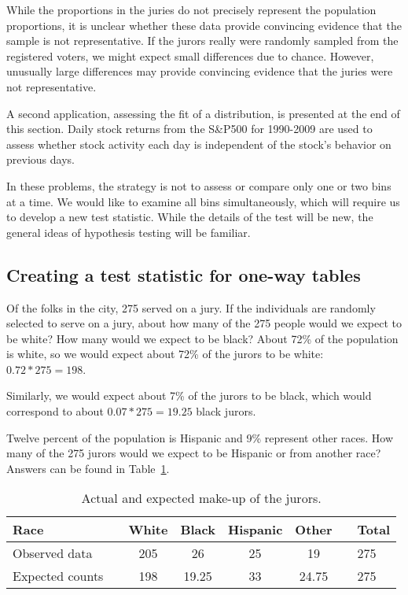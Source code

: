 While the proportions in the juries do not precisely represent the population proportions, it is unclear whether these data provide convincing evidence that the sample is not representative. If the jurors really were randomly sampled from the registered voters, we might expect small differences due to chance. However, unusually large differences may provide convincing evidence that the juries were not representative.

A second application, assessing the fit of a distribution, is presented at the end of this section. Daily stock returns from the S\&P500 for 1990-2009 are used to assess whether stock activity each day is independent of the stock's behavior on previous days.

In these problems, the strategy is not to assess or compare only one or two bins at a time. We would like to examine all bins simultaneously, which will require us to develop a new test statistic. While the details of the test will be new, the general ideas of hypothesis testing will be familiar.

\subsection{Creating a test statistic for one-way tables}

\begin{example}{Of the folks in the city, 275 served on a jury. If the individuals are randomly selected to serve on a jury, about how many of the 275 people would we expect to be white? How many would we expect to be black?}
About 72\% of the population is white, so we would expect about 72\% of the jurors to be white: $0.72*275 = 198$.

Similarly, we would expect about 7\% of the jurors to be black, which would correspond to about $0.07*275 = 19.25$ black jurors.
\end{example}

\begin{exercise}
Twelve percent of the population is Hispanic and 9\% represent other races. How many of the 275 jurors would we expect to be Hispanic or from another race? Answers can be found in Table~\ref{expectedJuryRepresentationIfNoBias}.
\end{exercise}

\begin{table}[h]
\centering
\begin{tabular}{ll ccc c ll}
\hline
Race	 & \hspace{2mm} & White & Black & Hispanic & Other & \hspace{2mm} & Total \\
\hline
Observed data			&	& 205 & 26	& 25 & 19	&	& 275 \\
Expected counts	 &	& 198 & 19.25 & 33 & 24.75 & & 275 \\
\hline
\end{tabular}
\vspace{-1.5mm}
\caption{Actual and expected make-up of the jurors.}
\label{expectedJuryRepresentationIfNoBias}
\end{table}

